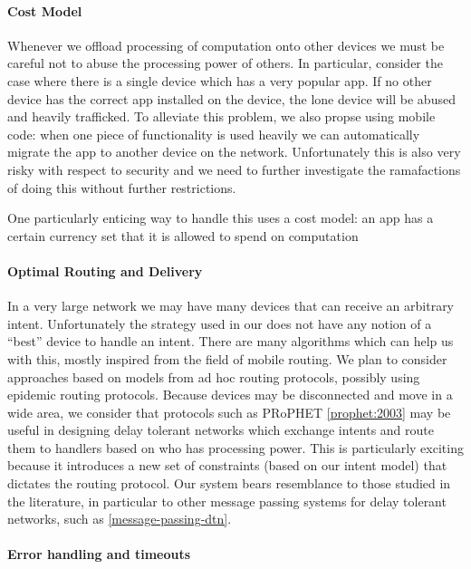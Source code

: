 \documentclass{acm_proc_article-sp}
\begin{document}
\paragraph{Cost Model}

Whenever we offload processing of computation onto other devices we
must be careful not to abuse the processing power of others.  In
particular, consider the case where there is a single device which has
a very popular app.  If no other device has the correct app installed
on the device, the lone device will be abused and heavily trafficked.
To alleviate this problem, we also propse using mobile code: when one
piece of functionality is used heavily we can automatically migrate
the app to another device on the network.  Unfortunately this is also
very risky with respect to security and we need to further investigate
the ramafactions of doing this without further restrictions.

One particularly enticing way to handle this uses a cost model: an app
has a certain currency set that it is allowed to spend on computation

\paragraph{Optimal Routing and Delivery}

In a very large network we may have many devices that can receive an
arbitrary intent.  Unfortunately the strategy used in our does not
have any notion of a ``best'' device to handle an intent.  There are
many algorithms which can help us with this, mostly inspired from the
field of mobile routing.  We plan to consider approaches based on
models from ad hoc routing protocols, possibly using epidemic routing
protocols.  Because devices may be disconnected and move in a wide
area, we consider that protocols such as PRoPHET \ref{prophet:2003}
may be useful in designing delay tolerant networks which exchange
intents and route them to handlers based on who has processing power.
This is particularly exciting because it introduces a new set of
constraints (based on our intent model) that dictates the routing
protocol.  Our system bears resemblance to those studied in the
literature, in particular to other message passing systems for delay
tolerant networks, such as \ref{message-passing-dtn}.

\paragraph{Error handling and timeouts} 
\end{document}
